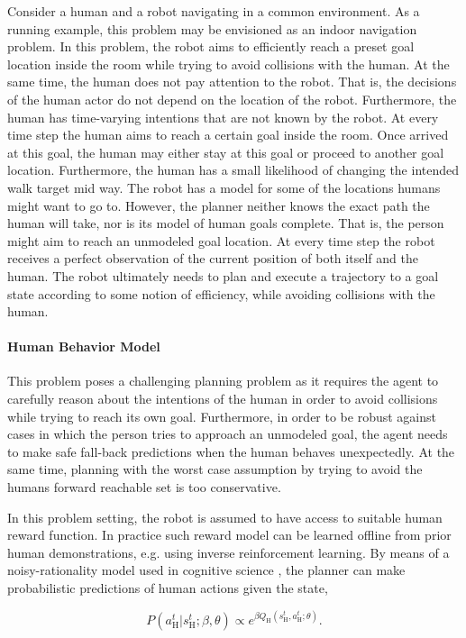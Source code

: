 Consider a human and a robot navigating in a common environment. As a running
example, this problem may be envisioned as an indoor navigation problem. In
this problem, the robot aims to efficiently reach a preset goal location
inside the room while trying to avoid collisions with the human. At the same
time, the human does not pay attention to the robot. That is, the decisions of
the human actor do not depend on the location of the robot. Furthermore, the
human has time-varying intentions that are not known by the robot. At every
time step the human aims to reach a certain goal inside the room. Once arrived
at this goal, the human may either stay at this goal or proceed to another goal
location. Furthermore, the human has a small likelihood of changing the
intended walk target mid way. The robot has a model for some of the locations
humans might want to go to. However, the planner neither knows the exact path
the human will take, nor is its model of human goals complete. That is, the
person might aim to reach an unmodeled goal location. At every time step the
robot receives a perfect observation of the current position of both itself and
the human. The robot ultimately needs to plan and execute a trajectory to
a goal state according to some notion of efficiency, while avoiding collisions
with the human.

\paragraph{Human Behavior Model}

This problem poses a challenging planning problem as it requires the agent to
carefully reason about the intentions of the human in order to avoid collisions
while trying to reach its own goal. Furthermore, in order to be robust against
cases in which the person tries to approach an unmodeled goal, the agent needs
to make safe fall-back predictions when the human behaves unexpectedly. At the
same time, planning with the worst case assumption by trying to avoid the
humans forward reachable set is too conservative.

In this problem setting, the robot is assumed to have access to suitable human
reward function. In practice such reward model can be learned offline from
prior human demonstrations, e.g. using inverse reinforcement
learning. By means of a noisy-rationality model used in cognitive
science \cite{baker2007goal}, the planner can make probabilistic predictions
of human actions given the state,

\begin{equation}\label{eq:boltzmann}
  P\left(a^t_\text{H} | s^t_\text{H}; \beta, \theta \right) \propto e^{\beta Q_\text{H}\left(s^t_\text{H}, a^t_\text{H}; \theta\right)}.
\end{equation}

